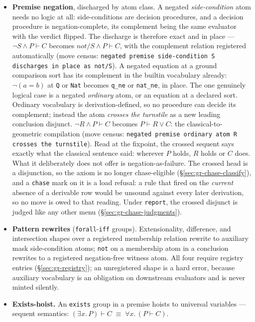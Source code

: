\begin{itemize}
\item \textbf{Premise negation}, discharged by atom class. A negated
\emph{side-condition} atom needs no logic at all: side-conditions
are decision procedures, and a decision procedure is
negation-complete, its complement being the same evaluator with the
verdict flipped. The discharge is therefore exact and in place ---
$\lnot S \land P \vdash C$ becomes $\mathit{not/S} \land P \vdash C$,
with the complement relation registered automatically (move census:
\texttt{negated premise side-condition S discharges in place as
not/S}). A negated equation at a ground comparison sort has its
complement in the builtin vocabulary already: $\lnot(a = b)$ at
\texttt{Q} or \texttt{Nat} becomes \texttt{q\_ne} or \texttt{nat\_ne},
in place. The one genuinely logical case is a negated \emph{ordinary}
atom, or an equation at a declared sort. Ordinary vocabulary is
derivation-defined, so no procedure can decide its complement;
instead the atom \emph{crosses the turnstile} as a new leading
conclusion disjunct. $\lnot R \land P \vdash C$ becomes
$P \vdash R \lor C$: the classical-to-geometric compilation (move
census: \texttt{negated premise ordinary atom R crosses the
turnstile}). Read at the fixpoint, the crossed sequent says exactly
what the classical sentence said: wherever $P$ holds, $R$ holds or
$C$ does. What it deliberately does not offer is
negation-as-failure. The crossed head is a disjunction, so the axiom
is no longer chase-eligible (\S\ref{sec:gr-chase-classify}), and a
\texttt{chase} mark on it is a load refusal: a rule that fired on the
\emph{current} absence of a derivable row would be unsound against
every later derivation, so no move is owed to that reading. Under
\texttt{report}, the crossed disjunct is judged like any other menu
(\S\ref{sec:gr-chase-judgments}).
\item \textbf{Pattern rewrites} (\texttt{forall}-\texttt{iff}
groups). Extensionality, difference, and intersection shapes over a
registered membership relation rewrite to auxiliary mask
side-condition atoms; \texttt{not} on a membership atom in a
conclusion rewrites to a registered negation-free witness atom. All
four require registry entries (\S\ref{sec:gr-registry}); an
unregistered shape is a hard error, because auxiliary vocabulary is
an obligation on downstream evaluators and is never minted silently.
\item \textbf{Exists-hoist.} An \texttt{exists} group in a premise
hoists to universal variables — sequent semantics:
$(\exists x.\,P) \vdash C \;\equiv\; \forall x.\,(P \vdash C)$.

\end{itemize}
